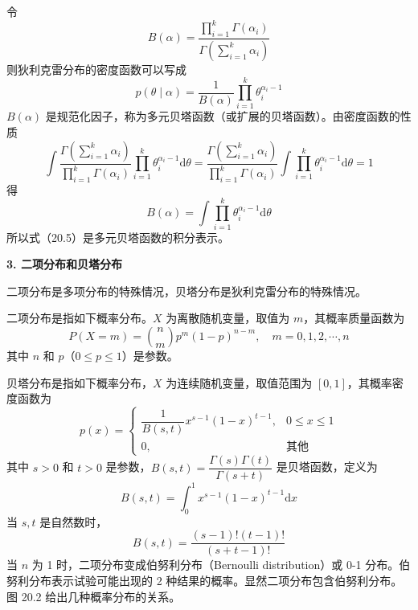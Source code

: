 \documentclass[UTF8,12pt,a4paper,fontset=fandol]{ctexart}
\begin{document}
令
\begin{equation}
B(\alpha)=\frac{\prod_{i=1}^k\Gamma(\alpha_i)}{\Gamma\left(\sum_{i=1}^k\alpha_i\right)}
\tag{20.3}
\end{equation}
则狄利克雷分布的密度函数可以写成
\begin{equation}
p(\theta\mid \alpha)=\frac{1}{B(\alpha)}\prod_{i=1}^k\theta_i^{\alpha_i-1}
\tag{20.4}
\end{equation}
$B(\alpha)$ 是规范化因子，称为多元贝塔函数（或扩展的贝塔函数）。由密度函数的性质
\[
\int \frac{\Gamma\left(\sum_{i=1}^k \alpha_i\right)}{\prod_{i=1}^k\Gamma(\alpha_i)}
\prod_{i=1}^k\theta_i^{\alpha_i-1}\mathrm{d}\theta
=\frac{\Gamma\left(\sum_{i=1}^k \alpha_i\right)}{\prod_{i=1}^k\Gamma(\alpha_i)}
\int \prod_{i=1}^k\theta_i^{\alpha_i-1}\mathrm{d}\theta=1
\]
得
\begin{equation}
B(\alpha)=\int \prod_{i=1}^k\theta_i^{\alpha_i-1}\mathrm{d}\theta
\tag{20.5}
\end{equation}
所以式（20.5）是多元贝塔函数的积分表示。

\noindent\textbf{3. 二项分布和贝塔分布}

二项分布是多项分布的特殊情况，贝塔分布是狄利克雷分布的特殊情况。

二项分布是指如下概率分布。$X$ 为离散随机变量，取值为 $m$，其概率质量函数为
\begin{equation}
P(X=m)=\binom{n}{m}p^m(1-p)^{n-m},\quad m=0,1,2,\cdots,n
\tag{20.6}
\end{equation}
其中 $n$ 和 $p$（$0\leq p\leq 1$）是参数。

贝塔分布是指如下概率分布，$X$ 为连续随机变量，取值范围为 $[0,1]$，其概率密度函数为
\begin{equation}
p(x)=
\begin{cases}
\dfrac{1}{B(s,t)}x^{s-1}(1-x)^{t-1}, & 0\leq x\leq 1\\
0, & \text{其他}
\end{cases}
\tag{20.7}
\end{equation}
其中 $s>0$ 和 $t>0$ 是参数，$B(s,t)=\dfrac{\Gamma(s)\Gamma(t)}{\Gamma(s+t)}$ 是贝塔函数，定义为
\begin{equation}
B(s,t)=\int_0^1 x^{s-1}(1-x)^{t-1}\mathrm{d}x
\tag{20.8}
\end{equation}
当 $s,t$ 是自然数时，
\begin{equation}
B(s,t)=\frac{(s-1)!(t-1)!}{(s+t-1)!}
\tag{20.9}
\end{equation}
当 $n$ 为 1 时，二项分布变成伯努利分布（Bernoulli distribution）或 0-1 分布。伯努利分布表示试验可能出现的 2 种结果的概率。显然二项分布包含伯努利分布。图 20.2 给出几种概率分布的关系。
\end{document}
